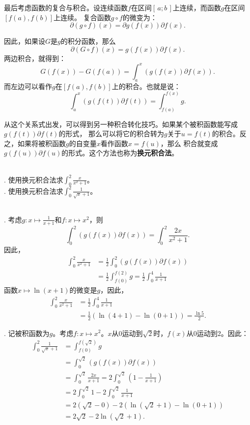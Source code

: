 \documentclass[12pt,UTF8]{ctexbook}
\begin{document}
最后考虑函数的复合与积合。设连续函数$f$在区间$[\,a; b\,]$上连续，而函数$g$在区间$[f(a), f(b)]$上连续。
复合函数$g\circ f$的微变为：
$$ \partial (g \circ f) (x) = \partial g(f(x)) \partial f (x). $$

因此，如果设$G$是$g$的积分函数，那么
$$ \partial (G \circ f) (x) = g(f(x)) \partial f (x). $$
两边积合，就得到：
$$ G(f(x)) - G(f(a)) = \int_a^x \left( g(f(x)) \partial f (x) \right).$$
而左边可以看作$g$在$[f(a), f(b)]$上的积合。也就是说：
$$ \int_a^x \left( g(f(t)) \partial f (t) \right) = \int_{f(a)}^{f(x)} g.$$

从这个关系式出发，可以得到另一种积合转化技巧。如果某个被积函数能写成$g(f(t)) \partial f (t)$的形式，
那么可以将它的积合转为$g$关于$u = f(t)$的积合。反之，如果将被积函数$g$的自变量$x$看作函数$x = f(u)$，那么
积合就变成$g(f(u)) \partial f (u)$的形式。这个方法也称为\textbf{换元积合法}。

\begin{et}
    \mbox{} \\
    . 使用换元积合法求$\int_0^2 \frac{x}{x^2 + 1}$。 \\
    . 使用换元积合法求$\int_0^2 \frac{1}{\sqrt{x} + 1}$。
\end{et}

\begin{so}
    \mbox{} \\
    . 考虑$g: x\mapsto \frac{1}{x + 1}$和$f: x\mapsto x^2$，则
    $$ \int_0^2 \left( g(f(x)) \partial f (x) \right) = \int_0^2 \frac{2x}{x^2 + 1}. $$
    因此，
    \begin{align*}
        \int_0^2 \frac{x}{x^2 + 1} &= \frac{1}{2} \int_0^2 \left( g(f(x)) \partial f (x) \right) \\
        &= \frac{1}{2}\int_{f(0)}^{f(2)} g = \frac{1}{2}\int_0^4 \frac{1}{x + 1} 
    \end{align*}
    函数$x\mapsto \ln{(x + 1)}$的微变是$g$，因此，
    \begin{align*}
        \int_0^2 \frac{x}{x^2 + 1} &= \frac{1}{2}\int_0^4 \frac{1}{x + 1} \\
        &= \frac{1}{2}\left(\ln{(4 + 1)} - \ln{(0 + 1)}\right) = \frac{\ln{5}}{2}.
    \end{align*}

    . 记被积函数为$g$。考虑$f: x\mapsto x^2$。$x$从$0$运动到$\sqrt{2}$时，$f(x)$从$0$运动到$2$。因此：
    \begin{align*}
        \int_0^2 \frac{1}{\sqrt{x} + 1} &= \int_{f(0)}^{f(\sqrt{2})} g \\
        &= \int_0^{\sqrt{2}} \left( g(f(x)) \partial f (x) \right) \\
        &= \int_0^{\sqrt{2}} \frac{2x}{x + 1} = 2\int_0^{\sqrt{2}} \left( 1 - \frac{1}{x + 1} \right) \\
        &= 2\int_0^{\sqrt{2}} 1 - 2\int_0^{\sqrt{2}} \frac{1}{x + 1} \\
        &= 2(\sqrt{2} - 0) - 2 \left(\ln{(\sqrt{2} + 1)} - \ln{(0 + 1)}\right) \\
        &= 2\sqrt{2} - 2\ln{(\sqrt{2} + 1)}.
    \end{align*}
\end{so}
\end{document}
